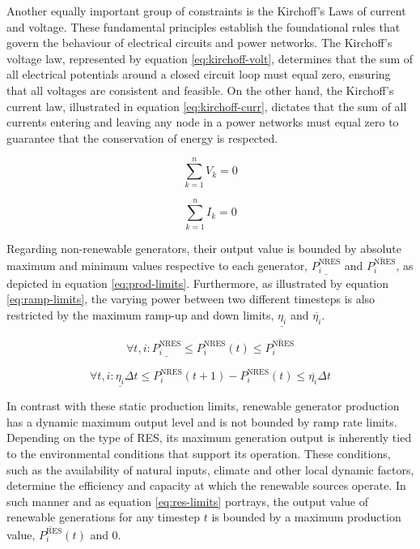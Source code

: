 Another equally important group of constraints is the Kirchoff's Laws of current and voltage. These fundamental principles establish the foundational rules that govern the behaviour of electrical circuits and power networks. The Kirchoff's voltage law, represented by equation \ref{eq:kirchoff-volt}, determines that the sum of all electrical potentials around a closed circuit loop must equal zero, ensuring that all voltages are consistent and feasible. On the other hand, the Kirchoff's current law, illustrated in equation \ref{eq:kirchoff-curr}, dictates that the sum of all currents entering and leaving any node in a power networks must equal zero to guarantee that the conservation of energy is respected. 

\begin{equation} \label{eq:kirchoff-volt}
	\sum_{k=1}^n  V_k = 0
\end{equation}

\begin{equation} \label{eq:kirchoff-curr}
	\sum_{k=1}^n  I_k = 0
\end{equation}


Regarding non-renewable generators, their output value is bounded by absolute maximum and minimum values respective to each generator, $\underline{P^\text{NRES}_i}$ and $\overline{P^\text{NRES}_i}$, as depicted in equation \ref{eq:prod-limits}. Furthermore, as illustrated by equation \ref{eq:ramp-limits}, the varying power between two different timesteps is also restricted by the maximum ramp-up and down limits, $\underline{\eta_i }$ and $\overline{\eta_i }$. \par

\begin{equation} \label{eq:prod-limits}
	\forall t, i: \underline{P^\text{NRES}_i} \leq P^\text{NRES}_i(t) \leq \overline{P^\text{NRES}_i}
\end{equation}

\begin{equation} \label{eq:ramp-limits}
	\forall t, i: \underline{\eta_i } \Delta t \leq P^\text{NRES}_i (t + 1) - P^\text{NRES}_i (t) \leq \overline{\eta_i} \Delta t
\end{equation}

In contrast with these static production limits, renewable generator production has a dynamic maximum output level and is not bounded by ramp rate limits. Depending on the type of \ac{RES}, its maximum generation output is inherently tied to the environmental conditions that support its operation. These conditions, such as the availability of natural inputs, climate and other local dynamic factors, determine the efficiency and capacity at which the renewable sources operate. In such manner and as equation \ref{eq:res-limits} portrays, the output value of renewable generations for any timestep $t$ is bounded by a maximum production value, $\overline{P^\text{RES}_i} (t)$ and 0.

